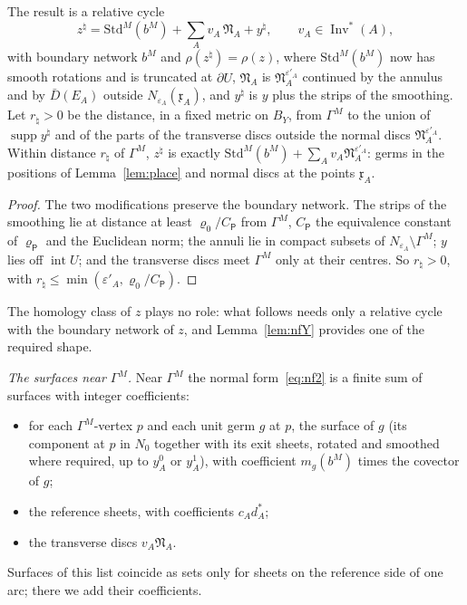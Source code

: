 \begin{lemma}\label{lem:nfY}
The result is a relative cycle
\begin{equation}\label{eq:nf2}
z^\natural=\mathrm{Std}^M(b^M)+\sum_Av_A\,\mathfrak N_A+y^\natural,\qquad v_A\in\operatorname{Inv}^*(A),
\end{equation}
with boundary network $b^M$ and $\rho(z^\natural)=\rho(z)$, where $\mathrm{Std}^M(b^M)$ now has smooth rotations and is
truncated at $\partial U$, $\mathfrak N_A$ is $\mathfrak N^{\varepsilon'_A}_A$ continued by the annulus and by $\bar D(E_A)$
outside $N_{\varepsilon_A}(\mathfrak x_A)$, and $y^\natural$ is $y$ plus the strips of the smoothing. Let $r_\natural>0$ be
the distance, in a fixed metric on $B_Y$, from $\Gamma^M$ to the union of $\operatorname{supp}y^\natural$ and of the parts
of the transverse discs outside the normal discs $\mathfrak N^{\varepsilon'_A}_A$. Within distance $r_\natural$ of
$\Gamma^M$, $z^\natural$ is exactly $\mathrm{Std}^M(b^M)+\sum_Av_A\mathfrak N^{\varepsilon'_A}_A$: germs in the positions of
Lemma~\ref{lem:place} and normal discs at the points $\mathfrak x_A$.
\end{lemma}

\begin{proof}
The two modifications preserve the boundary network. The strips of the smoothing lie at distance at least
$\varrho_0/C_{\mathsf P}$ from $\Gamma^M$, $C_{\mathsf P}$ the equivalence constant of $\varrho_{\mathsf P}$ and the
Euclidean norm; the annuli lie in compact subsets of $N_{\varepsilon_A}\setminus\Gamma^M$; $y$ lies off
$\operatorname{int}U$; and the transverse discs meet $\Gamma^M$ only at their centres. So $r_\natural>0$, with
$r_\natural\le\min(\varepsilon'_A,\varrho_0/C_{\mathsf P})$.
\end{proof}

The homology class of $z$ plays no role: what follows needs only a relative cycle with the boundary network of $z$, and
Lemma~\ref{lem:nfY} provides one of the required shape.

\emph{The surfaces near $\Gamma^M$.} Near $\Gamma^M$ the normal form~\eqref{eq:nf2} is a finite sum of surfaces with
integer coefficients:
\begin{itemize}
\item[(S1)] for each $\Gamma^M$-vertex $p$ and each unit germ $g$ at $p$, the surface of $g$ (its component at $p$ in
$N_0$ together with its exit sheets, rotated and smoothed where required, up to $y^0_A$ or $y^1_A$), with coefficient
$m_g(b^M)$ times the covector of $g$;
\item[(S2)] the reference sheets, with coefficients $c_Ad^*_A$;
\item[(S3)] the transverse discs $v_A\mathfrak N_A$.
\end{itemize}
Surfaces of this list coincide as sets only for sheets on the reference side of one arc; there we add their coefficients.

